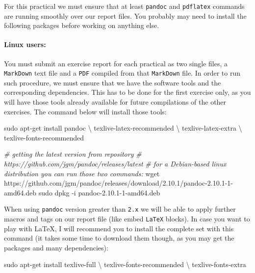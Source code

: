 \documentclass[10pt,a4paper,]{article}
\newenvironment{Shaded}{}{}
\newcommand{\CommentTok}[1]{\textcolor[rgb]{0.38,0.63,0.69}{\textit{#1}}}
\newcommand{\FunctionTok}[1]{\textcolor[rgb]{0.02,0.16,0.49}{#1}}
\newcommand{\NormalTok}[1]{#1}
\begin{document}
For this practical we must ensure that at least \texttt{pandoc} and
\texttt{pdflatex} commands are running smoothly over our report files.
You probably may need to install the following packages before working
on anything else.

\hypertarget{linux-users}{%
\paragraph{\texorpdfstring{\textbf{Linux}
users:}{Linux users:}}\label{linux-users}}

You must submit an exercise report for each practical as two single
files, a \texttt{MarkDown} text file and a \texttt{PDF} compiled from
that \texttt{MarkDown} file. In order to run such procedure, we must
ensure that we have the software tools and the corresponding
dependencies. This has to be done for the first exercise only, as you
will have those tools already available for future compilations of the
other exercises. The command below will install those tools:

\begin{Shaded}
\begin{Highlighting}[]
\FunctionTok{sudo}\NormalTok{ apt-get install pandoc \textbackslash{}}
\NormalTok{                     texlive-latex-recommended \textbackslash{}}
\NormalTok{                     texlive-latex-extra \textbackslash{}}
\NormalTok{                     texlive-fonts-recommended}

\CommentTok{# getting the latest version from repository}
\CommentTok{#     https://github.com/jgm/pandoc/releases/latest}
\CommentTok{# for a Debian-based linux distribution you can run those two commands:}
\FunctionTok{wget}\NormalTok{ https://github.com/jgm/pandoc/releases/download/2.10.1/pandoc-2.10.1-1-amd64.deb}
\FunctionTok{sudo}\NormalTok{ dpkg -i pandoc-2.10.1-1-amd64.deb}
\end{Highlighting}
\end{Shaded}

When using \texttt{pandoc} version greater than \texttt{2.x} we will be
able to apply further macros and tags on our report file (like embed
\texttt{LaTeX} blocks). In case you want to play with \LaTeX, I will
recommend you to install the complete set with this command (it takes
some time to download them though, as you may get the packages and many
dependencies):

\begin{Shaded}
\begin{Highlighting}[]
\FunctionTok{sudo}\NormalTok{ apt-get install texlive-full \textbackslash{}}
\NormalTok{                     texlive-fonts-recommended \textbackslash{}}
\NormalTok{                     texlive-fonts-extra}
\end{Highlighting}
\end{Shaded}
\end{document}
